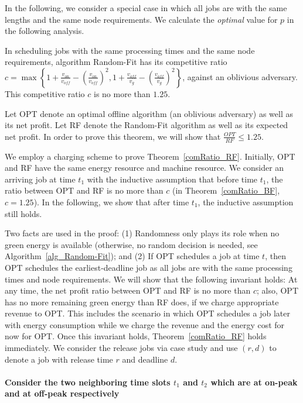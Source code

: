 \documentclass[conference]{IEEEtran}
\begin{document}
In the following, we consider a special case in which all jobs are with the same lengths and the same node requirements. We calculate the \emph{optimal} value for $p$ in the following analysis.

\begin{theorem}
In scheduling jobs with the same processing times and the same node requirements, algorithm Random-Fit has its competitive ratio $c = \max \left\lbrace 1 + \frac{v_{on}}{v_{off}} - \left(\frac{v_{on}}{v_{off}}\right)^2, 1 + \frac{v_{off}}{v_g} - \left(\frac{v_{off}}{v_g}\right)^2 \right\rbrace$, against an oblivious adversary. This competitive ratio $c$ is no more than $1.25$.
\label{comRatio_RF}
\end{theorem}

\begin{IEEEproof}
Let OPT denote an optimal offline algorithm (an oblivious adversary) as well as its net profit. Let RF denote the Random-Fit algorithm as well as its expected net profit. In order to prove this theorem, we will show that $\frac{OPT}{RF} \le 1.25$.

We employ a charging scheme to prove Theorem~\ref{comRatio_RF}. Initially, OPT and RF have the same energy resource and machine resource. We consider an arriving job at time $t_1$ with the inductive assumption that before time $t_1$, the ratio between OPT and RF is no more than $c$ (in Theorem~\ref{comRatio_BF}, $c = 1.25$). In the following, we show that after time $t_1$, the inductive assumption still holds.

Two facts are used in the proof: (1) Randomness only plays its role when no green energy is available (otherwise, no random decision is needed, see Algorithm~\ref{alg_Random-Fit}); and (2) If OPT schedules a job at time $t$, then OPT schedules the earliest-deadline job as all jobs are with the same processing times and node requirements. We will show that the following invariant holds: At any time, the net profit ratio between OPT and RF is no more than $c$; also, OPT has no more remaining green energy than RF does, if we charge appropriate revenue to OPT. This includes the scenario in which OPT schedules a job later with energy consumption while we charge the revenue and the energy cost for now for OPT. Once this invariant holds, Theorem~\ref{comRatio_RF} holds immediately. We consider the release jobs via case study and use $(r, d)$ to denote a job with release time $r$ and deadline $d$.

\paragraph{Consider the two neighboring time slots $t_1$ and $t_2$ which are at on-peak and at off-peak respectively}


\end{IEEEproof}
\end{document}
